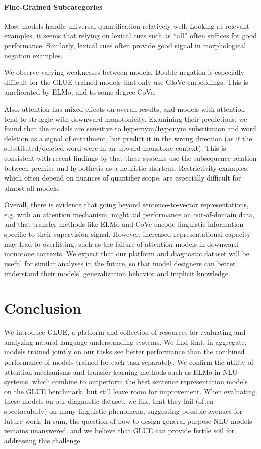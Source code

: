 \paragraph{Fine-Grained Subcategories}

Most models handle universal quantification relatively well. Looking at relevant examples, it seems that relying on lexical cues such as ``all'' often suffices for good performance. Similarly, lexical cues often provide good signal in morphological negation examples.

We observe varying weaknesses between models. Double negation is especially difficult for the GLUE-trained models that only use GloVe embeddings. This is ameliorated by ELMo, and to some degree CoVe.

Also, attention has mixed effects on overall results, and models with attention tend to struggle with downward monotonicity. Examining their predictions, we found that the models are sensitive to hypernym/hyponym substitution and word deletion as a signal of entailment, but predict it in the wrong direction (as if the substituted/deleted word were in an upward monotone context). This is consistent with recent findings by \citet{mccoy2019subsequence} that these systems use the subsequence relation between premise and hypothesis as a heuristic shortcut. Restrictivity examples, which often depend on nuances of quantifier scope, are especially difficult for almost all models.

Overall, there is evidence that going beyond sentence-to-vector representations, e.g. with an attention mechanism, might aid performance on out-of-domain data, and that transfer methods like ELMo and CoVe encode linguistic information specific to their supervision signal. However, increased representational capacity may lead to overfitting, such as the failure of attention models in downward monotone contexts. We expect that our platform and diagnostic dataset will be useful for similar analyses in the future, so that model designers can better understand their models' generalization behavior and implicit knowledge. 

\section{Conclusion}\label{sec:conclusion}

We introduce GLUE, a platform and collection of resources for evaluating and analyzing natural language understanding systems. We find that, in aggregate, models trained jointly on our tasks see better performance than the combined performance of models trained for each task separately. We confirm the utility of attention mechanisms and transfer learning methods such as ELMo in NLU systems, which combine to outperform the best sentence representation models on the GLUE benchmark, but still leave room for improvement. When evaluating these models on our diagnostic dataset, we find that they fail (often spectacularly) on many linguistic phenomena, suggesting possible avenues for future work. In sum, the question of how to design general-purpose NLU models remains unanswered, and we believe that GLUE can provide fertile soil for addressing this challenge.


